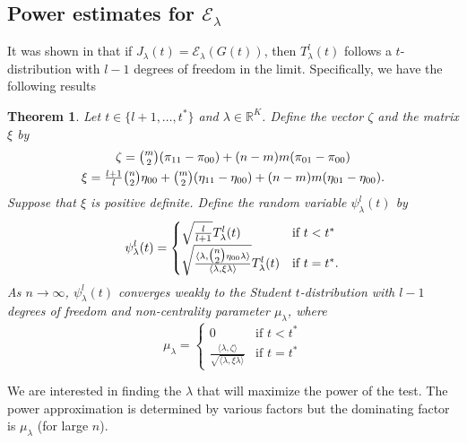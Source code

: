 \documentclass[10pt,draftclsnofoot,onecolumn]{IEEEtran}
\newtheorem{theorem}{Theorem}
\theoremstyle{definition}
\begin{document}
\subsection{Power estimates for $\mathcal{E}_\lambda$}
\label{sec:power-estim-mathc}
It was shown in \cite{lee11} that if $J_\lambda(t) =
\mathcal{E}_{\lambda}(G(t))$, then $T_{\lambda}^{l}(t)$ follows a
$t$-distribution with $l - 1$ degrees of freedom in the
limit. Specifically, we have the following results
\begin{theorem}
  \label{thm:9}
  Let $t \in \{l+1, \dots, t^{*}\}$ and $\lambda \in
  \mathbb{R}^{K}$. Define the vector $\zeta$ and the matrix $\xi$ by
  \begin{gather*}
    \zeta = \tbinom{m}{2}(\pi_{11} - \pi_{00}) + (n-m)m(\pi_{01} -
    \pi_{00}) \\
    \xi = \tfrac{l+1}{l}\tbinom{n}{2} \eta_{00} +
          \tbinom{m}{2}(\eta_{11} - \eta_{00}) + (n-m)m(\eta_{01} -
          \eta_{00}).
  \end{gather*}
  Suppose that $\xi$ is positive definite.
  Define the random variable $\psi^{l}_{\lambda}(t)$ by
  \begin{equation}
    \label{eq:10}
    \psi^{l}_{\lambda}(t) = \begin{cases}
      \sqrt{\frac{l}{l + 1}} T_{\lambda}^{l}(t)& \text{if $t < t^{*}$}
      \\ \sqrt{\frac{\langle \lambda, \tbinom{n}{2} \eta_{00}
            \lambda \rangle}{\langle \lambda, \xi
            \lambda \rangle}} T_{\lambda}^{l}(t) & \text{if $t =
          t^{*}$}.
      \end{cases}
  \end{equation}
As $n \rightarrow \infty$,
  $\psi^{l}_{\lambda}(t)$ converges weakly to the Student
  $t$-distribution with $l-1$ degrees of freedom and non-centrality
  parameter $\mu_{\lambda}$, where
  \begin{equation}
    \label{eq:15}
    \mu_{\lambda} = \begin{cases}
      0 & \text{if $t < t^{*}$} \\
      \frac{\langle \lambda, \zeta \rangle}{\sqrt{\langle \lambda, \xi \lambda \rangle}} & \text{if $t = t^{*}$} 
    \end{cases}
  \end{equation}
\end{theorem}
We are interested in finding the $\lambda$ that will maximize the
power of the test. The power approximation is determined by various
factors but the dominating factor is $\mu_{\lambda}$ (for large $n$). 
\end{document}
